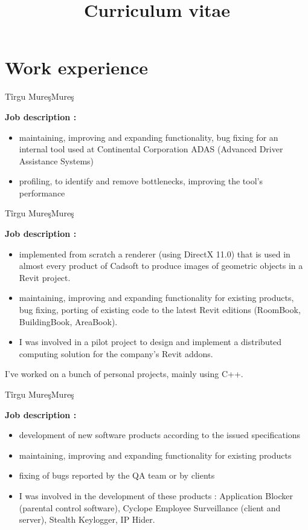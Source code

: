 \documentclass[14pt,a4paper,sans]{moderncv}   %
\title{Curriculum vitae}                     %
\begin{document}
\maketitle

\section{Work experience}

{T\^{i}rgu Mure\c{s}}{Mure\c{s}}{
\textbf{Job description :}
\begin{itemize}
\item maintaining, improving and expanding functionality, bug fixing for an internal tool used at Continental Corporation ADAS (Advanced Driver Assistance Systems)
\item profiling, to identify and remove bottlenecks, improving the tool's performance
\end{itemize}}

{T\^{i}rgu Mure\c{s}}{Mure\c{s}}{
\textbf{Job description :}
\begin{itemize}
\item implemented from scratch a renderer (using DirectX 11.0) that is used in
almost every product of Cadsoft to produce images of geometric objects in a Revit
project.
\item maintaining, improving and expanding functionality for existing products,
bug fixing, porting of existing code to the latest Revit editions (RoomBook,
BuildingBook, AreaBook).
\item I was involved in a pilot project to design and implement a
distributed computing solution for the company's Revit addons.
\end{itemize}}

 {}{I've worked on a bunch of personal projects, mainly
using C++.}{}

{T\^{i}rgu Mure\c{s}}{Mure\c{s}}{
\textbf{Job description :}
\begin{itemize}
\item development of new software products according to the issued specifications
\item maintaining, improving and expanding functionality for existing products
\item fixing of bugs reported by the QA team or by clients
\item I was involved in the development of these products : 
    Application Blocker (parental control software), 
    Cyclope Employee Surveillance (client and server), 
    Stealth Keylogger, IP Hider.
\end{itemize}}
\end{document}
